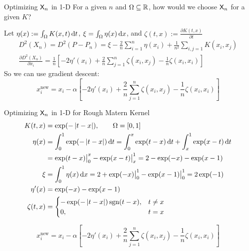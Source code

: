 \documentclass[10pt,compress,xcolor={usenames,dvipsnames},aspectratio=169]{beamer}
\begin{document}
\begin{frame}{Optimizing $\mathsf{X}_n$ in 1-D}
	For a given $n$ and $\Omega \subseteq \mathbb{R}$, how would we choose $\mathsf{X}_n$ for a given $K$?  
	
	Let $\eta(x) := \int_\Omega K(x,t) \, {\rm d} t$, $\xi = \int_\Omega \eta(x) \, {\rm d} x$, and $\zeta(t,x) := \frac{\partial K(t,x)}{\partial t}$
	\begin{gather*}
		 D^2(X_n) = D^2(P-P_n) = \xi - \frac 2{n} \sum_{i=1}^n  \eta(x_i) + \frac 1{n^2} \sum_{i,j=1}K(x_i,x_j) \\
		 \frac{\partial D^2(X_n)}{\partial x_i} = \frac {1}{n} \left [- 2\eta'(x_i)  + \frac 2{n} \sum_{j =1}^n \zeta(x_i,x_j) - \frac 1{n} \zeta(x_i,x_i) \right]
	\end{gather*}
So we can use gradient descent:
\[
x_i^{\text{new}} = x_i - \alpha \left [- 2\eta'(x_i)  + \frac 2{n} \sum_{j =1}^n \zeta(x_i,x_j) - \frac 1{n} \zeta(x_i,x_i) \right]
\]
\end{frame}

\begin{frame}{Optimizing $\mathsf{X}_n$ in 1-D for Rough Matern Kernel}
	\begin{align*}
		K(t,x) &= \exp(-\left \lvert t-x \right \rvert), \qquad \Omega = [0,1] \\
		\eta(x) &= \int_0^1 \exp(-\left \lvert t-x \right \rvert) \, {\rm d} t = \int_0^x \exp(t-x) \, {\rm d} t +  \int_x^1 \exp(x - t) \, {\rm d} t \\
		& = \exp(t-x) \bigr \rvert_0^x - \exp(x - t) \bigr\rvert_x^1 = 2  - \exp(-x) - \exp(x-1) \\
		\xi &= \int_0^1 \eta(x) \, {\rm d} x =  2 + \exp(-x) \bigr \rvert_0^1 - \exp(x-1) \bigr \rvert_0^1 = 2 \exp(-1)  \\
		\eta'(x) &= \exp(-x)  - \exp(x-1) \\
		\zeta(t,x) & = \begin{cases} -\exp(-\left \lvert t-x \right \rvert) \operatorname{sgn}(t-x) ,& t \ne x\\
			0, & t = x
		\end{cases}
	\end{align*}
	
	\[
	x_i^{\text{new}} = x_i - \alpha \left [ -2\eta'(x_i)  + \frac 2{n} \sum_{j =1}^n \zeta(x_i,x_j) - \frac 1{n} \zeta(x_i,x_i) \right]
	\]
\end{frame}
\end{document}
